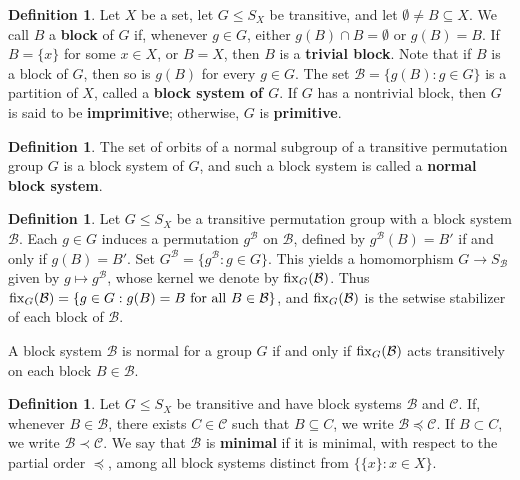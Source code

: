 \documentclass[11pt]{amsart}
\numberwithin{equation}{section}
\theoremstyle{definition}
\newtheorem{defin}[thrm]{Definition}
\def\fix{{\rm fix}}
\begin{document}
	\begin{defin}
		Let $X$ be a set, let $G \leq S_X$ be transitive, and let $\emptyset \ne B \subseteq X$. We call $B$ a \textbf{block} of $G$ if, whenever $g \in G$, either $g(B) \cap B = \emptyset$ or $g(B) = B$. If $B = \{x\}$ for some $x \in X$, or $B = X$, then $B$ is a \textbf{trivial block}. Note that if $B$ is a block of $G$, then so is $g(B)$ for every $g \in G$. The set ${\mathcal B} = \{g(B) : g \in G\}$ is a partition of $X$, called a \textbf{block system of $G$}. If $G$ has a nontrivial block, then $G$ is said to be \textbf{imprimitive}; otherwise, $G$ is \textbf{primitive}.
	\end{defin}
	
	\begin{defin}
		The set of orbits of a normal subgroup of a transitive permutation group $G$ is a block system of $G$, and such a block system is called a \textbf{normal block system}.
	\end{defin}
	
	\begin{defin}Let $G \le S_X$ be a transitive permutation group with a block system ${\mathcal B}$.  
		Each $g \in G$ induces a permutation $g^{\mathcal B}$ on ${\mathcal B}$, defined by
		$g^{\mathcal B}(B) = B'$ if and only if $g(B) = B'$.
		Set
		$G^{\mathcal B} = \{ g^{\mathcal B} : g \in G \}$.
		This yields a homomorphism $G \to S_{\mathcal B}$ given by $g \mapsto g^{\mathcal B}$, whose kernel we denote by $\fix_G({\mathcal B})$.  
		Thus $
		\fix_G({\mathcal B}) = \{ g \in G : g(B) = B \text{ for all } B \in {\mathcal B} \}$,
		and $\fix_G({\mathcal B})$ is the setwise stabilizer of each block of ${\mathcal B}$.
		
	\end{defin}
	
	A block system $\mathcal B$ is normal for a group $G$ if and only if  $\fix_G(\mathcal B)$ acts transitively on each block $B \in \mathcal B$.
	
	\begin{defin}
		Let $G \le S_X$ be transitive and have block systems ${\mathcal B}$ and ${\mathcal C}$. If, whenever $B \in {\mathcal B}$, there exists $C \in {\mathcal C}$ such that $B \subseteq C$, we write ${\mathcal B} \preceq {\mathcal C}$. If $B \subset C$, we write ${\mathcal B} \prec {\mathcal C}$. We say that ${\mathcal B}$ is \textbf{minimal} if it is minimal, with respect to the partial order $\preceq$, among all block systems distinct from $\{\{x\} : x \in X\}$.
	\end{defin}
	
\end{document}
